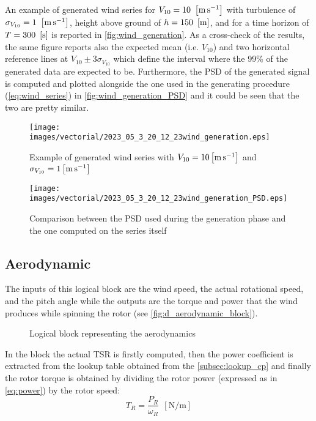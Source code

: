 An example of generated wind series for $V_{10}=10 \ \left[\si{\meter\per\second}\right]$ with turbulence of $\sigma_{V_{10}}=1 \ \mesunt{\meter\per\second}$, height above ground of $h=150 
 \ \left[\si{\meter}\right]$, and for a time horizon of $T = 300 \ \left[\si{\second}\right]$ is reported in \autoref{fig:wind_generation}. As a cross-check of the results, the same figure reports also the expected mean (i.e. $V_{10}$) and two horizontal reference lines at $V_{10}\pm3\sigma_{V_{10}}$ which define the interval where the 99\% of the generated data are expected to be. Furthermore, the PSD of the generated signal is computed and plotted alongside the one used in the generating procedure (\autoref{eq:wind_series}) in \autoref{fig:wind_generation_PSD} and it could be seen that the two are pretty similar. 
\begin{figure}[htb]
    \centering
    \texttt{[image: images/vectorial/2023\_05\_3\_20\_12\_23wind\_generation.eps]}
    \caption{Example of generated wind series with $V_{10}=10\left[\si{\meter\per\second}\right]$ and $\sigma_{V_{10}}=1\left[\si{\meter\per\second}\right]$ }
    \label{fig:wind_generation}
\end{figure}

\begin{figure}[htb]
    \centering
    \texttt{[image: images/vectorial/2023\_05\_3\_20\_12\_23wind\_generation\_PSD.eps]}
    \caption{Comparison between the PSD used during the generation phase and the one computed on the series itself}
    \label{fig:wind_generation_PSD}
\end{figure}

\subsection{Aerodynamic}
The inputs of this logical block are the wind speed, the actual rotational speed, and the pitch angle while the outputs are the torque and power that the wind produces while spinning the rotor (see \autoref{fig:d_aerodynamic_block}). 
\begin{figure}
  \centering
  
  \caption{Logical block representing the aerodynamics}
  \label{fig:d_aerodynamic_block}
\end{figure}

In the block the actual \acrshort{TSR} is firstly computed, then the power coefficient is extracted from the lookup table obtained from the \autoref{subsec:lookup_cp} and finally the rotor torque is obtained by dividing the rotor power (expressed as in \autoref{eq:power}) by the rotor speed:
\begin{equation}
    T_R = \frac{P_R}{\omega_R} \ \ \left[\si{\newton\per\meter}\right]
\end{equation}

